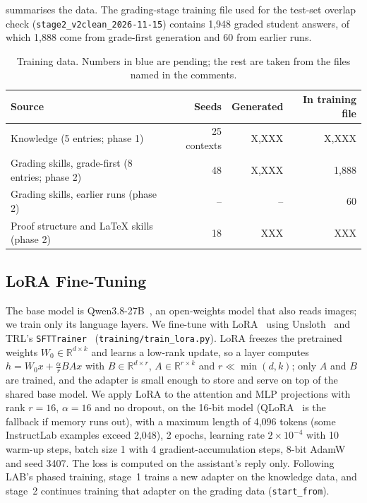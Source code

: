 \documentclass[11pt,a4paper]{article}
\newif\ifdraft
\newcommand{\todo}[2]{%
  \ifdraft\textcolor{red}{\textbf{[TODO #1:} #2\textbf{]}}\fi}
\newcommand{\ph}[1]{\ifdraft\textcolor{blue!70!black}{#1}\else #1\fi}
\newcommand{\file}[1]{\nolinkurl{#1}}
\theoremstyle{definition}
\begin{document}
 summarises the data. The grading-stage training file used for the test-set overlap check (\file{stage2_v2clean_2026-11-15}) contains 1,948 graded student answers, of which 1,888 come from grade-first generation and 60 from earlier runs.
\todo{}{Describe the 60 ``legacy'' answers (which pipeline, kept why), and fill the per-topic counts in \cref{tab:data} from \file{manifest.json} and the \file{prepare_data.py} log of the final training files.}

\begin{table}[t]
\centering
\caption{Training data. Numbers in blue are pending; the rest are taken from the files named in the comments.}
\label{tab:data}
\small
\begin{tabular}{lrrr}
\toprule
Source & Seeds & Generated & In training file\\
\midrule
Knowledge (5 entries; phase 1) & 25 contexts & \ph{X,XXX} & \ph{X,XXX}\\
Grading skills, grade-first (8 entries; phase 2) & 48 & \ph{X,XXX} & 1,888\\
Grading skills, earlier runs (phase 2) & -- & -- & 60\\
Proof structure and \LaTeX{} skills (phase 2) & 18 & \ph{XXX} & \ph{XXX}\\
\bottomrule
\end{tabular}
\end{table}

\subsection{LoRA Fine-Tuning}\label{sec:lora}
The base model is Qwen3.8-27B~\cite{qwen38}, an open-weights model that also reads images; we train only its language layers. We fine-tune with LoRA~\cite{hu2022lora} using Unsloth~\cite{unsloth} and TRL's \texttt{SFTTrainer}~\cite{trl} (\file{training/train_lora.py}). LoRA freezes the pretrained weights $W_0\in\mathbb{R}^{d\times k}$ and learns a low-rank update, so a layer computes $h = W_0x + \frac{\alpha}{r}BAx$ with $B\in\mathbb{R}^{d\times r}$, $A\in\mathbb{R}^{r\times k}$ and $r\ll\min(d,k)$; only $A$ and $B$ are trained, and the adapter is small enough to store and serve on top of the shared base model. We apply LoRA to the attention and MLP projections with rank $r=16$, $\alpha=16$ and no dropout, on the 16-bit model (QLoRA~\cite{dettmers2023qlora} is the fallback if memory runs out), with a maximum length of 4,096 tokens (some InstructLab examples exceed 2,048), 2 epochs, learning rate $2\times10^{-4}$ with 10 warm-up steps, batch size 1 with 4 gradient-accumulation steps, 8-bit AdamW and seed 3407. The loss is computed on the assistant's reply only. Following LAB's phased training, stage~1 trains a new adapter on the knowledge data, and stage~2 continues training that adapter on the grading data (\texttt{start\_from}).
\end{document}
